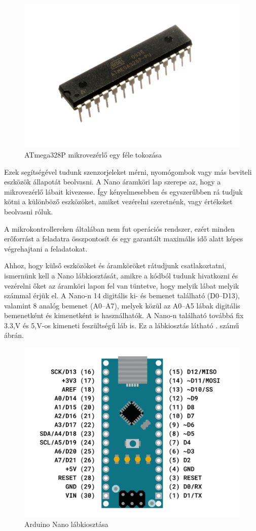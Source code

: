 \documentclass[]{thesis-ekf}
\theoremstyle{definition}
\theoremstyle{remark}
\begin{document}
\begin{figure}[th!]
	\centering
	\includegraphics[width=0.4\linewidth]{ATMEGA328P-PU}
	\caption[ATmega328P]{ATmega328P mikrovezérlő egy féle tokozása}
	\label{fig:atmega328p-pu}
\end{figure}

Ezek segítségével tudunk szenzorjeleket mérni, nyomógombok vagy más beviteli eszközök állapotát beolvasni. A Nano áramköri lap szerepe az, hogy a mikrovezérlő lábait kivezesse. Így kényelmesebben és egyszerűbben rá tudjuk kötni a különböző eszközöket, amiket vezérelni szeretnénk, vagy értékeket beolvasni róluk. 

A mikrokontrollereken általában nem fut operációs rendszer, ezért minden erőforrást a feladatra összpontosít és egy garantált maximális idő alatt képes végrehajtani a feladatokat. 

Ahhoz, hogy külső eszközöket és áramköröket rátudjunk csatlakoztatni, ismernünk kell a Nano lábkiosztását, amikre a kódból tudunk hivatkozni és vezérelni őket az áramköri lapon fel van tüntetve, hogy melyik lábat melyik számmal érjük el.  A Nano-n 14 digitális ki- és bemenet található (D0–D13), valamint 8 analóg bemenet (A0–A7), melyek közül az A0–A5 lábak digitális bemenetként és kimenetként is használhatók. A Nano-n található továbbá fix 3.3,V és 5,V-os kimeneti feszültségű láb is. Ez a lábkiosztás látható . számű ábrán.

\begin{figure}[th!]
	\centering
	\includegraphics[width=0.7\linewidth]{arduino-nano-pinout}
	\caption[Nano felépítés]{Arduino Nano lábkiosztása}
	\label{fig:arduino-nano-pinout}
\end{figure}
\end{document}
